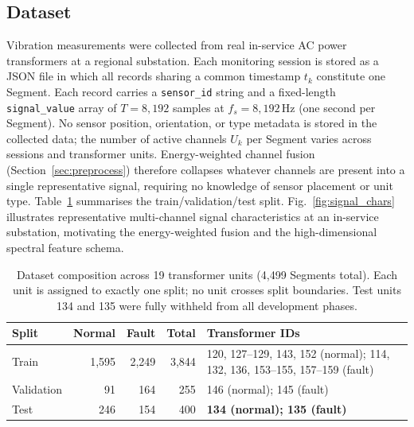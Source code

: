 \documentclass[preprint,12pt,3p]{elsarticle}
\begin{document}
\subsection{Dataset}
\label{sec:dataset}

Vibration measurements were collected from real in-service AC power
transformers at a regional substation.
Each monitoring session is stored as a JSON file in which all records
sharing a common timestamp $t_k$ constitute one Segment.
Each record carries a \texttt{sensor\_id} string and a fixed-length
\texttt{signal\_value} array of $T=8{,}192$ samples at
$f_s=8{,}192\,$Hz (one second per Segment).
No sensor position, orientation, or type metadata is stored in the
collected data; the number of active channels $U_k$ per Segment
varies across sessions and transformer units.
Energy-weighted channel fusion (Section~\ref{sec:preprocess})
therefore collapses whatever channels are present into a single
representative signal, requiring no knowledge of sensor placement or
unit type.
Table~\ref{tab:dataset} summarises the train/validation/test split.
Fig.~\ref{fig:signal_chars} illustrates representative multi-channel
signal characteristics at an in-service substation, motivating the
energy-weighted fusion and the high-dimensional spectral feature schema.

\begin{table}[H]
  \centering
  \small
  \caption{%
    Dataset composition across 19 transformer units
    (4{,}499 Segments total).
    Each unit is assigned to exactly one split; no unit crosses
    split boundaries.
    Test units 134 and 135 were fully withheld from all
    development phases.
  }
  \label{tab:dataset}
  \renewcommand{\arraystretch}{1.2}
  \begin{tabular}{@{}lrrrp{4.8cm}@{}}
    \toprule
    Split      & Normal & Fault & Total & Transformer IDs \\
    \midrule
    Train      & 1{,}595 & 2{,}249 & 3{,}844 &
      120, 127--129, 143, 152 (normal);
      114, 132, 136, 153--155, 157--159 (fault) \\
    Validation & 91  & 164 & 255 & 146 (normal); 145 (fault) \\
    Test       & 246 & 154 & 400 & \textbf{134 (normal); 135 (fault)} \\
    \bottomrule
  \end{tabular}
\end{table}
\end{document}
